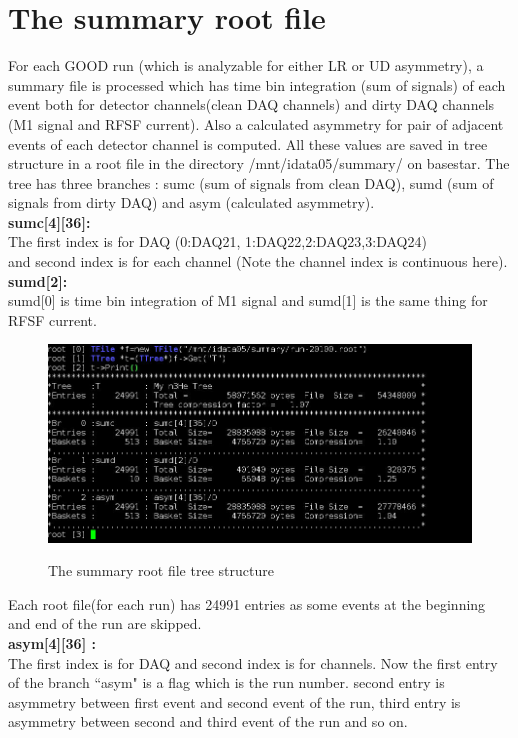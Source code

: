 \documentclass[12pt]{article}
\begin{document}
\section{The summary root file}
For each GOOD run (which is analyzable for either LR or UD asymmetry), a summary file is processed which has time bin integration (sum of signals) of each event both for detector channels(clean DAQ channels) and  dirty DAQ channels (M1 signal and RFSF current). Also a calculated asymmetry for pair of adjacent events of each detector channel is computed. All these values are saved in tree structure in a root file in the directory /mnt/idata05/summary/ on basestar.  
The tree has three branches : sumc (sum of signals from clean DAQ), sumd (sum of signals from dirty DAQ) and asym (calculated asymmetry).\\
\textbf{sumc[4][36]:} \\
The first index is for DAQ (0:DAQ21, 1:DAQ22,2:DAQ23,3:DAQ24)\\
and second index is for each channel (Note the channel index is continuous here).  \\
\textbf{sumd[2]: }\\
sumd[0] is time bin integration of M1 signal and sumd[1] is the same thing for RFSF current.

\begin{figure}[htb]
\centering
\includegraphics[width=6in]{summary_tree.png}\\
\caption{The summary root file tree structure}\label{f10}
\end{figure}
Each root file(for each run) has 24991 entries as some events at the beginning and end of the run are skipped.\\
\textbf{asym[4][36] :}\\
The first index is for DAQ and second index is for channels.
Now the first entry of the branch ``asym" is a flag which is the run number. second entry is asymmetry between first event and second event of the run, third entry is asymmetry between second and third event of the run and so on.  \\
\end{document}
